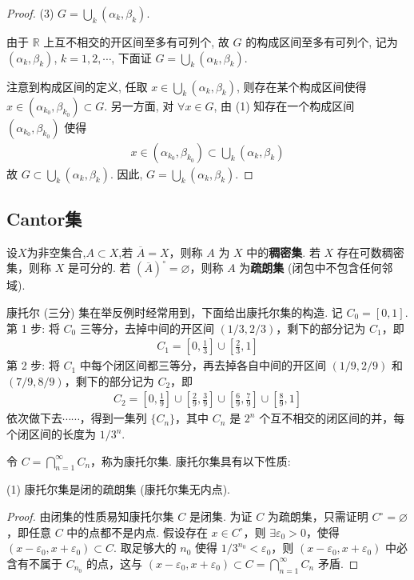 \documentclass[../../main.tex]{subfiles}
\begin{document}
\begin{proof}
(3) $G = \bigcup_{k}(\alpha_k, \beta_k)$.

由于 $\mathbb{R}$ 上互不相交的开区间至多有可列个, 故 $G$ 的构成区间至多有可列个, 记为 $(\alpha_k, \beta_k)$, $k = 1, 2, \cdots$, 下面证 $G = \bigcup_{k}(\alpha_k, \beta_k)$.

注意到构成区间的定义, 任取 $x \in \bigcup_{k}(\alpha_k, \beta_k)$, 则存在某个构成区间使得 $x \in (\alpha_{k_0}, \beta_{k_0}) \subset G$. 另一方面, 对 $\forall x \in G$, 由 (1) 知存在一个构成区间 $(\alpha_{k_0}, \beta_{k_0})$ 使得
\begin{align*}
x \in (\alpha_{k_0}, \beta_{k_0}) \subset \bigcup_{k}(\alpha_k, \beta_k)
\end{align*}
故 $G \subset \bigcup_{k}(\alpha_k, \beta_k)$. 因此, $G = \bigcup_{k}(\alpha_k, \beta_k)$.
\end{proof}



\subsection{Cantor集}

\begin{definition}[稠密集与疏朗集]
设$X$为非空集合,$A\subset X$,若 $\overline{A}=X$，则称 $A$ 为 $X$ 中的\textbf{稠密集}. 若 $X$ 存在可数稠密集，则称 $X$ 是可分的. 若 $(\overline{A})^\circ=\varnothing$，则称 $A$ 为\textbf{疏朗集} (闭包中不包含任何邻域).
\end{definition}


康托尔 (三分) 集在举反例时经常用到，下面给出康托尔集的构造.
记 $C_0 = [0,1]$. 第 1 步: 将 $C_0$ 三等分，去掉中间的开区间 $(1/3,2/3)$，剩下的部分记为 $C_1$，即
\begin{align*}
C_1 = \left[0,\frac{1}{3}\right]\cup\left[\frac{2}{3},1\right]
\end{align*}
第 2 步: 将 $C_1$ 中每个闭区间都三等分，再去掉各自中间的开区间 $(1/9,2/9)$ 和 $(7/9,8/9)$，剩下的部分记为 $C_2$，即
\begin{align*}
C_2 = \left[0,\frac{1}{9}\right]\cup\left[\frac{2}{9},\frac{3}{9}\right]\cup\left[\frac{6}{9},\frac{7}{9}\right]\cup\left[\frac{8}{9},1\right]
\end{align*}
依次做下去$\cdots\cdots$，得到一集列 $\{C_n\}$，其中 $C_n$ 是 $2^n$ 个互不相交的闭区间的并，每个闭区间的长度为 $1/3^n$.

令 $C = \bigcap_{n = 1}^{\infty}C_n$，称为康托尔集. 康托尔集具有以下性质:

(1) 康托尔集是闭的疏朗集 (康托尔集无内点).
\begin{proof}
由闭集的性质易知康托尔集 $C$ 是闭集. 为证 $C$ 为疏朗集，只需证明 $C^{\circ}=\varnothing$，即任意 $C$ 中的点都不是内点. 假设存在 $x\in C^{\circ}$，则 $\exists\varepsilon_0>0$，使得 $(x - \varepsilon_0,x + \varepsilon_0)\subset C$. 取足够大的 $n_0$ 使得 $1/3^{n_0}<\varepsilon_0$，则 $(x - \varepsilon_0,x + \varepsilon_0)$ 中必含有不属于 $C_{n_0}$ 的点，这与 $(x - \varepsilon_0,x + \varepsilon_0)\subset C = \bigcap_{n = 1}^{\infty}C_n$ 矛盾.
\end{proof}
\end{document}
